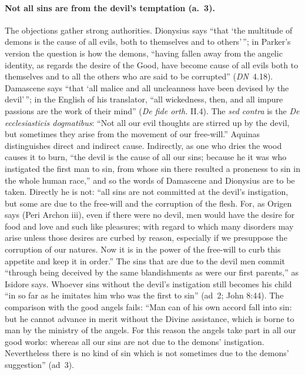\paragraph{Not all sins are from the devil's temptation (a.~3).} The
objections gather strong authorities. Dionysius says ``that `the multitude
of demons is the cause of all evils, both to themselves and to
others'\,''; in Parker's version the question is how the demons,
``having fallen away from the angelic identity, as regards the desire of
the Good, have become cause of all evils both to themselves and to all the
others who are said to be corrupted'' (\emph{DN}~4.18). Damascene says
``that `all malice and all uncleanness have been devised by the
devil'\,''; in the English of his translator, ``all wickedness, then, and
all impure passions are the work of their mind'' (\emph{De fide orth.}
II.4). The \emph{sed contra} is the \emph{De ecclesiasticis dogmatibus}:
``Not all our evil thoughts are stirred up by the devil, but sometimes they
arise from the movement of our free-will.'' Aquinas distinguishes direct
and indirect cause. Indirectly, as one who dries the wood causes it to
burn, ``the devil is the cause of all our sins; because he it was who
instigated the first man to sin, from whose sin there resulted a proneness
to sin in the whole human race,'' and so the words of Damascene and
Dionysius are to be taken. Directly he is not: ``all sins are not committed
at the devil's instigation, but some are due to the free-will and the
corruption of the flesh. For, as Origen says (Peri Archon iii), even if
there were no devil, men would have the desire for food and love and such
like pleasures; with regard to which many disorders may arise unless those
desires are curbed by reason, especially if we presuppose the corruption of
our natures. Now it is in the power of the free-will to curb this appetite
and keep it in order.'' The sins that are due to the devil men commit
``through being deceived by the same blandishments as were our first
parents,'' as Isidore says. Whoever sins without the devil's instigation
still becomes his child ``in so far as he imitates him who was the first to
sin'' (ad~2; John 8:44). The comparison with the good angels fails: ``Man
can of his own accord fall into sin: but he cannot advance in merit without
the Divine assistance, which is borne to man by the ministry of the angels.
For this reason the angels take part in all our good works: whereas all our
sins are not due to the demons' instigation. Nevertheless there is no kind
of sin which is not sometimes due to the demons' suggestion'' (ad~3).

